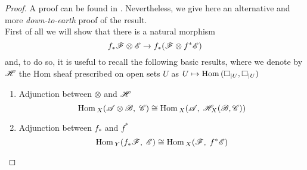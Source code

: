 	\begin{proof}
		A proof can be found in \cite[\href{http://stacks.math.columbia.edu/tag/01E8}{Lemma 01E8}]{stacks-project}. Nevertheless, we give here an alternative and more \emph{down-to-earth} proof of the result. \\
		First of all we will show that there is a natural morphism
		$$  f_*\mathscr{F}\otimes \mathscr{E} \to f_*(\mathscr{F}\otimes f^* \mathscr{E}) $$
		and, to do so, it is useful to recall the following basic results, where we denote by $\mathscr{H}$ the Hom sheaf prescribed on open sets $U$ as $U\mapsto \operatorname{Hom}{}(\square_{\mid U}, \square_{\mid U})$
		\begin{enumerate}[(1)]
			\item Adjunction between $\otimes$ and $\mathscr{H}$
			$$ \operatorname{Hom}{}_X(\mathscr{A}\otimes \mathscr{B},\; \mathscr{C}) \cong \operatorname{Hom}{}_X(\mathscr{A},\; \mathscr{H}_X(\mathscr{B},\mathscr{C})) $$

			\item Adjunction between $f_*$ and $f^*$
			$$\operatorname{Hom}{}_Y(f_* \mathscr{F},\; \mathscr{E} ) \cong \operatorname{Hom}{}_X (\mathscr{F},\; f^*\mathscr{E})$$


\end{enumerate}
\end{proof}
